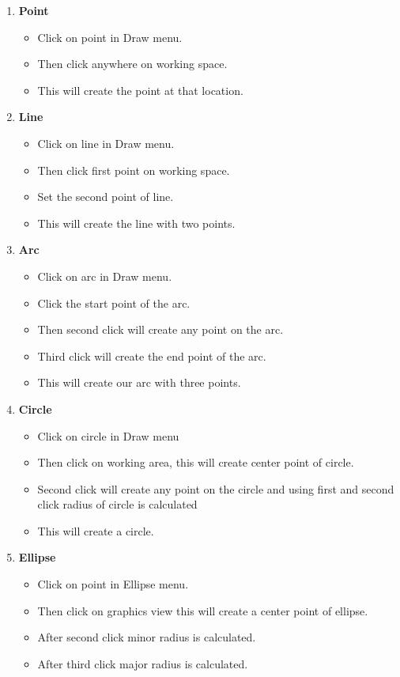 \begin{enumerate}
\item \textbf{Point}
\begin{itemize}
\item Click on point in Draw menu.
\item Then click anywhere on working space.
\item This will create the point at that location.
\end{itemize}
\item \textbf{Line}
\begin{itemize}
\item Click on line in Draw menu.
\item Then click first point on working space.
\item Set the second point of line.
\item This will create the line with two points.
\end{itemize}
\item \textbf{Arc}
\begin{itemize}
\item Click on arc in Draw menu.
\item Click the start point of the arc.
\item Then second click will create any point on the arc.
\item Third click will create the end point of the arc.
\item This will create our arc with three points.
\end{itemize}
\item \textbf{Circle}
\begin{itemize}
\item Click on circle in Draw menu
\item Then click on working area, this will create center point of circle.
\item Second click will create any point on the circle and using first and second click radius of circle is calculated
\item This will create a circle.
\end{itemize}
\item \textbf{Ellipse}
\begin{itemize}
\item Click on point in Ellipse menu.
\item Then click on graphics view this will create a center point of ellipse.
\item After second click minor radius is calculated.
\item After third click major radius is calculated.

\end{itemize}
\end{enumerate}
